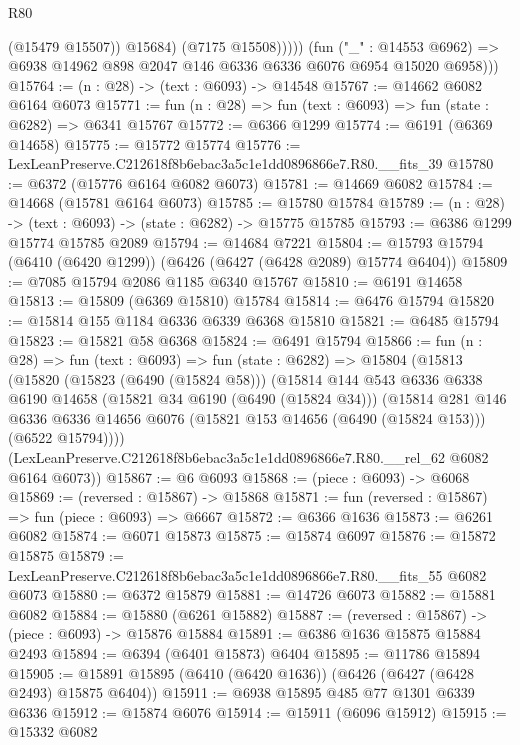 \begin{lexlean}{R80}
\begin{coremodule}
                    (@15479 @15507))
                  @15684)
                (@7175 @15508)))))
        (fun ("_" : @14553 @6962) =>
        @6938 @14962 @898 @2047 @146 @6336 @6336 @6076 @6954 @15020 @6958)))
@15764 := (n : @28) -> (text : @6093) -> @14548
@15767 := @14662 @6082 @6164 @6073
@15771 := fun (n : @28) => fun (text : @6093) => fun (state : @6282) => @6341 @15767
@15772 := @6366 @1299
@15774 := @6191 (@6369 @14658)
@15775 := @15772 @15774
@15776 := LexLeanPreserve.C212618f8b6ebac3a5c1e1dd0896866e7.R80.__fits_39
@15780 := @6372 (@15776 @6164 @6082 @6073)
@15781 := @14669 @6082
@15784 := @14668 (@15781 @6164 @6073)
@15785 := @15780 @15784
@15789 := (n : @28) -> (text : @6093) -> (state : @6282) -> @15775 @15785
@15793 := @6386 @1299 @15774 @15785 @2089
@15794 := @14684 @7221
@15804 := @15793 @15794 (@6410 (@6420 @1299)) (@6426 (@6427 (@6428 @2089) @15774 @6404))
@15809 := @7085 @15794 @2086 @1185 @6340 @15767
@15810 := @6191 @14658
@15813 := @15809 (@6369 @15810) @15784
@15814 := @6476 @15794
@15820 := @15814 @155 @1184 @6336 @6339 @6368 @15810
@15821 := @6485 @15794
@15823 := @15821 @58 @6368
@15824 := @6491 @15794
@15866 := fun (n : @28) =>
  fun (text : @6093) =>
  fun (state : @6282) =>
  @15804
    (@15813
      (@15820
        (@15823 (@6490 (@15824 @58)))
        (@15814
          @144
          @543
          @6336
          @6338
          @6190
          @14658
          (@15821 @34 @6190 (@6490 (@15824 @34)))
          (@15814
            @281
            @146
            @6336
            @6336
            @14656
            @6076
            (@15821 @153 @14656 (@6490 (@15824 @153)))
            (@6522 @15794))))
      (LexLeanPreserve.C212618f8b6ebac3a5c1e1dd0896866e7.R80.__rel_62 @6082 @6164 @6073))
@15867 := @6 @6093
@15868 := (piece : @6093) -> @6068
@15869 := (reversed : @15867) -> @15868
@15871 := fun (reversed : @15867) => fun (piece : @6093) => @6667
@15872 := @6366 @1636
@15873 := @6261 @6082
@15874 := @6071 @15873
@15875 := @15874 @6097
@15876 := @15872 @15875
@15879 := LexLeanPreserve.C212618f8b6ebac3a5c1e1dd0896866e7.R80.__fits_55 @6082 @6073
@15880 := @6372 @15879
@15881 := @14726 @6073
@15882 := @15881 @6082
@15884 := @15880 (@6261 @15882)
@15887 := (reversed : @15867) -> (piece : @6093) -> @15876 @15884
@15891 := @6386 @1636 @15875 @15884 @2493
@15894 := @6394 (@6401 @15873) @6404
@15895 := @11786 @15894
@15905 := @15891 @15895 (@6410 (@6420 @1636)) (@6426 (@6427 (@6428 @2493) @15875 @6404))
@15911 := @6938 @15895 @485 @77 @1301 @6339 @6336
@15912 := @15874 @6076
@15914 := @15911 (@6096 @15912)
@15915 := @15332 @6082

\end{coremodule}
\end{lexlean}
